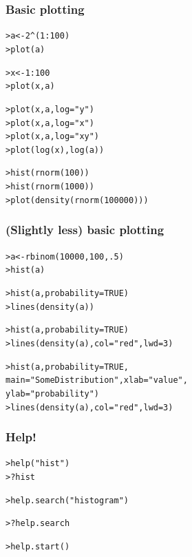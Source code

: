 \documentclass[t]{beamer} %
\begin{document}
\begin{frame}[fragile]
  \frametitle{Basic plotting}

\begin{alltt}
> a<-2^(1:100)        
> plot(a)

> x<-1:100            
> plot(x,a)

> plot(x,a,log="y")   
> plot(x,a,log="x")
> plot(x,a,log="xy")
> plot(log(x),log(a))

> hist(rnorm(100))    
> hist(rnorm(1000))
> plot(density(rnorm(100000)))
\end{alltt}

\end{frame}

\begin{frame}[fragile]
  \frametitle{(Slightly less) basic plotting}

\begin{alltt}
> a <- rbinom(10000,100,.5)
> hist(a)

> hist(a, probability=TRUE)
> lines(density(a))

> hist(a, probability=TRUE)
> lines(density(a), col="red", lwd=3)

> hist(a, probability=TRUE, 
  main="Some Distribution", xlab="value",
  ylab="probability")
> lines(density(a), col="red", lwd=3)
\end{alltt}

\end{frame}

\begin{frame}[fragile]
  \frametitle{Help!}

\begin{alltt}
> help("hist")  
> ?hist          

> help.search("histogram")

> ?help.search

> help.start()  

\end{alltt}

\end{frame}
\end{document}

